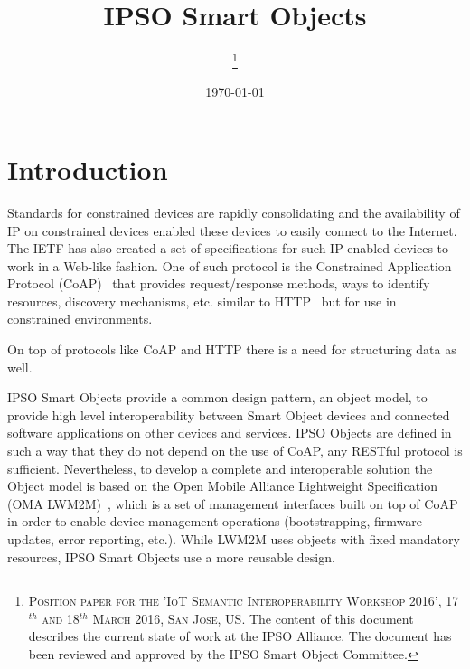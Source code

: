 \documentclass[peerreview, a4paper, 7pt]{IEEEtran}
\begin{document}
\title{IPSO Smart Objects}

\author{
\thanks{\textsc{Position paper for the 'IoT Semantic Interoperability Workshop 2016', 17$^{th}$ and 18$^{th}$ March 2016, San Jose, US.} The content of this document describes the current state of work at the IPSO Alliance. The document has been reviewed and approved by the IPSO Smart Object Committee.}
}

\date{\today}

\maketitle


\section{Introduction}

Standards for constrained devices are rapidly consolidating and the availability of IP on constrained devices enabled these devices to easily connect to the Internet. The IETF has also created a set of specifications for such IP-enabled devices to work in a Web-like fashion. One of such protocol is the Constrained Application Protocol (CoAP)~\cite{rfc7252} that provides request/response methods, ways to identify resources, discovery mechanisms, etc. similar to HTTP~\cite{rfc2616} but for use in constrained environments.

On top of protocols like CoAP and HTTP there is a need for structuring data as well.

IPSO Smart Objects provide a common design pattern, an object model, to provide high level interoperability between Smart Object devices and connected software applications on other devices and services. IPSO Objects are defined in such a way that they do not depend on the use of CoAP, any RESTful protocol is sufficient. Nevertheless, to develop a complete and interoperable solution the Object model is based on the Open Mobile Alliance Lightweight Specification (OMA LWM2M)~\cite{lwm2m}, which is a set of management interfaces built on top of CoAP in order to enable device management operations (bootstrapping, firmware updates, error reporting, etc.). While LWM2M uses objects with fixed mandatory resources, IPSO Smart Objects use a more reusable design. 
\end{document}
